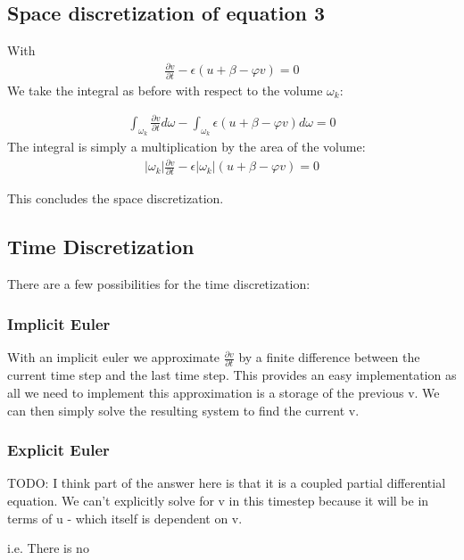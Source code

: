\documentclass{finalproject}
\begin{document}
\subsection{Space discretization of equation 3}
With 
\begin{align*}
\frac{\partial v}{\partial t} - \epsilon(u + \beta - \varphi v) = 0
\end{align*}
We take the integral as before with respect to the volume $\omega_k$:

\begin{align*}
\int_{\omega_k}\frac{\partial v}{\partial t} d\omega - \int_{\omega_k} \epsilon(u + \beta - \varphi v)d\omega = 0
\end{align*}
The integral is simply a multiplication by the area of the volume:
\begin{align*}
|\omega_k|\frac{\partial v}{\partial t} - \epsilon |\omega_k| (u + \beta - \varphi v) = 0
\end{align*}

This concludes the space discretization.
\subsection{Time Discretization}

There are a few possibilities for the time discretization:

\subsubsection{Implicit Euler}
With an implicit euler we approximate $\frac{\partial v}{\partial t}$ by a finite difference between the current time step and the last time step. This provides an easy implementation as all we need to implement this approximation is a storage of the previous v. We can then simply solve the resulting system to find the current v.
\subsubsection{Explicit Euler}
TODO: I think part of the answer here is that it is a coupled partial differential equation. We can't explicitly solve for v in this timestep because it will be in terms of u - which itself is dependent on v. 

i.e. There is no 
%
%
\end{document}
